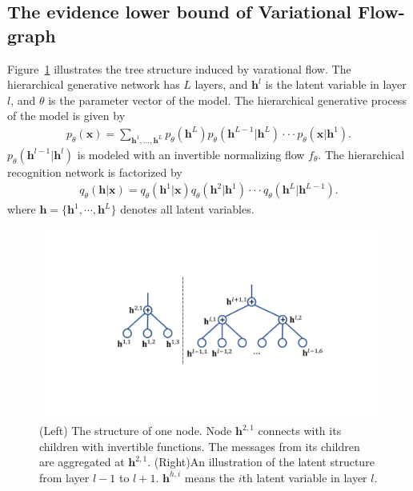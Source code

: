 \documentclass[conference]{IEEEtran}
\begin{document}
\subsection{The evidence lower bound of Variational Flow-graph}
Figure~\ref{fig:node_tree} illustrates the tree structure induced by varational flow.  The hierarchical generative network has $L$ layers, and $\mathbf{h}^l$ is the latent variable in layer $l$, and $\theta$ is the parameter vector of the model. The hierarchical generative process of the model is given by 
\begin{align*}
p_\theta(\mathbf{x}) = \sum_{\mathbf{h}^1, ..., \mathbf{h}^L} p_\theta(\mathbf{h}^L)p_\theta(\mathbf{h}^{L-1} | \mathbf{h}^{L}) \cdot \cdot  \cdot  p_\theta(\mathbf{x} | \mathbf{h}^{1}) .
\end{align*}
$p_\theta(\mathbf{h}^{l-1} | \mathbf{h}^{l})$ is modeled with an invertible normalizing flow $f_\theta$. The hierarchical recognition network is factorized by
\begin{align*}
q_\theta(\mathbf{h}| \mathbf{x}) =  q_\theta(\mathbf{h}^1 | \mathbf{x})  q_\theta(\mathbf{h}^2 | \mathbf{h}^1) \cdot \cdot  \cdot  q_\theta(\mathbf{h}^{L} | \mathbf{h}^{L-1}) .
\end{align*}
where $\mathbf{h}=\{\mathbf{h}^1, \cdots, \mathbf{h}^L \}$ denotes all latent variables. 
 \begin{figure}[!htbp]
\begin{center}
 \includegraphics[width=0.95\linewidth]{fig/node.pdf}
\end{center}
\caption{ (Left) The structure of one node. Node $\mathbf{h}^{2,1}$ connects with its children with invertible functions. The messages from its children are aggregated at $\mathbf{h}^{2,1}$.   (Right)An illustration of the latent structure from layer $l-1$ to $l+1$.  $\mathbf{h}^{h, i}$ means the $i$th latent variable  in layer $l$. }
\label{fig:node_tree}
\end{figure}
\end{document}
